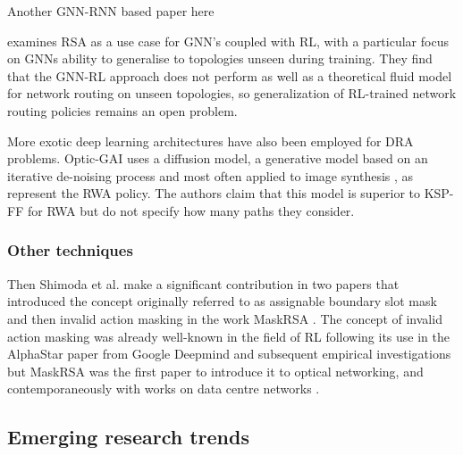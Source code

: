  \cite{suarez-varela_graph_2023} \cite{li_gnn-based_2022}  Another GNN-RNN based paper here \cite{xiong_graph_2024}
 
 \cite{almasan_deep_2022} examines RSA as a use case for GNN's coupled with RL, with a particular focus on GNNs ability to generalise to topologies unseen during training. They find that the GNN-RL approach does not perform as well as a theoretical fluid model for network routing on unseen topologies, so generalization of RL-trained network routing policies remains an open problem.
 
 
 More exotic deep learning architectures have also been employed for DRA problems. Optic-GAI \cite{li_opticgai_2024} uses a diffusion model, a generative model based on an iterative de-noising process and most often applied to image synthesis \cite{ho_denoising_2020}, as represent the RWA policy. The authors claim that this model is superior to KSP-FF for RWA but do not specify how many paths they consider.
 
 \cite{cheng_ptrnet-rsa_2024}
 

 


\subsubsection{Other techniques}
\label{sec:other_tehcniques}


Then Shimoda et al. make a significant contribution in two papers that introduced the concept originally referred to as assignable boundary slot mask \cite{shimoda_deep_2021} and then invalid action masking in the work MaskRSA \cite{shimoda_mask_2021}. The concept of invalid action masking was already well-known in the field of RL following its use in the AlphaStar paper from Google Deepmind \cite{vinyals_grandmaster_2019} and subsequent empirical investigations \cite{huang_closer_2020} but MaskRSA was the first paper to introduce it to optical networking, and contemporaneously with works on data centre networks \cite{shabka_resource_2021}.





\subsection{Emerging research trends}
\label{sec:survey-emerging_trends}

